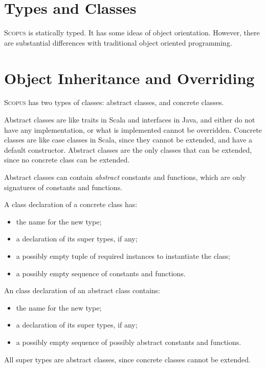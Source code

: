 \documentclass[12pt,a4paper]{book}
\newcommand{\Scopus}{\textsc{Scopus}\xspace}
\begin{document}
    \section{Types and Classes}

    \Scopus is statically typed.
    It has some ideas of object orientation.
    However, there are substantial differences with traditional object oriented programming.


    \section{Object Inheritance and Overriding}

    \Scopus has two types of classes: abstract classes, and concrete classes.

    Abstract classes are like traits in Scala and interfaces in Java, and either do not have any implementation, or what is implemented cannot be overridden.
    Concrete classes are like case classes in Scala, since they cannot be extended, and have a default constructor.
    Abstract classes are the only classes that can be extended, since no concrete class can be extended.

    Abstract classes can contain \textit{abstract} constants and functions, which are only signatures of constants and functions.

    A class declaration of a concrete class has:
    \begin{itemize}
        \item the name for the new type;
        \item a declaration of its super types, if any;
        \item a possibly empty tuple of required instances to instantiate the class;
        \item a possibly empty sequence of constants and functions.
    \end{itemize}


    An class declaration of an abstract class contains:
    \begin{itemize}
        \item the name for the new type;
        \item a declaration of its super types, if any;
        \item a possibly empty sequence of possibly abstract constants and functions.
    \end{itemize}

    All super types are abstract classes, since concrete classes cannot be extended.
\end{document}
